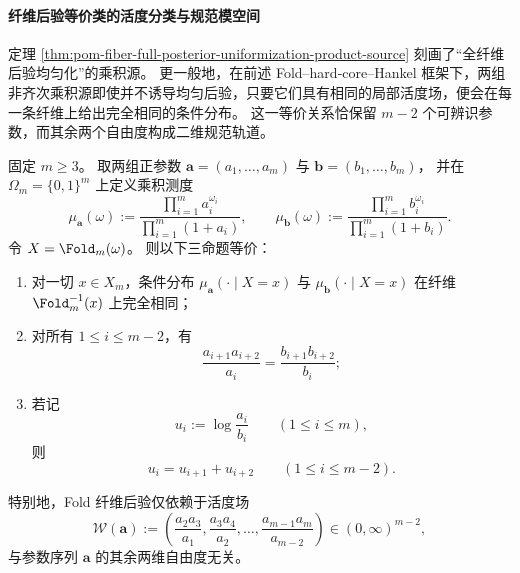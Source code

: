 \paragraph{纤维后验等价类的活度分类与规范模空间}
定理 \ref{thm:pom-fiber-full-posterior-uniformization-product-source} 刻画了“全纤维后验均匀化”的乘积源。
更一般地，在前述 Fold--hard-core--Hankel 框架下，两组非齐次乘积源即使并不诱导均匀后验，只要它们具有相同的局部活度场，便会在每一条纤维上给出完全相同的条件分布。
这一等价关系恰保留 \(m-2\) 个可辨识参数，而其余两个自由度构成二维规范轨道。

\begin{theorem}[纤维后验等价的活度场刻画]\label{thm:pom-fiber-posterior-equivalence-activity-field}
固定 \(m\ge 3\)。
取两组正参数
\(
\boldsymbol a=(a_1,\dots,a_m)
\)
与
\(
\boldsymbol b=(b_1,\dots,b_m)
\)，
并在 \(\Omega_m=\{0,1\}^m\) 上定义乘积测度
\[
\mu_{\boldsymbol a}(\omega):=\frac{\prod_{i=1}^{m}a_i^{\omega_i}}{\prod_{i=1}^{m}(1+a_i)},
\qquad
\mu_{\boldsymbol b}(\omega):=\frac{\prod_{i=1}^{m}b_i^{\omega_i}}{\prod_{i=1}^{m}(1+b_i)}.
\]
令 \(X=\Fold_m(\omega)\)。
则以下三命题等价：
\begin{enumerate}
  \item 对一切 \(x\in X_m\)，条件分布
  \(
  \mu_{\boldsymbol a}(\cdot\mid X=x)
  \)
  与
  \(
  \mu_{\boldsymbol b}(\cdot\mid X=x)
  \)
  在纤维 \(\Fold_m^{-1}(x)\) 上完全相同；
  \item 对所有 \(1\le i\le m-2\)，有
  \[
  \frac{a_{i+1}a_{i+2}}{a_i}=\frac{b_{i+1}b_{i+2}}{b_i};
  \]
  \item 若记
  \[
  u_i:=\log\frac{a_i}{b_i}\qquad(1\le i\le m),
  \]
  则
  \[
  u_i=u_{i+1}+u_{i+2}\qquad(1\le i\le m-2).
  \]
\end{enumerate}
特别地，Fold 纤维后验仅依赖于活度场
\[
\mathcal W(\boldsymbol a):=
\left(
\frac{a_2a_3}{a_1},
\frac{a_3a_4}{a_2},
\dots,
\frac{a_{m-1}a_m}{a_{m-2}}
\right)\in(0,\infty)^{m-2},
\]
与参数序列 \(\boldsymbol a\) 的其余两维自由度无关。
\end{theorem}
